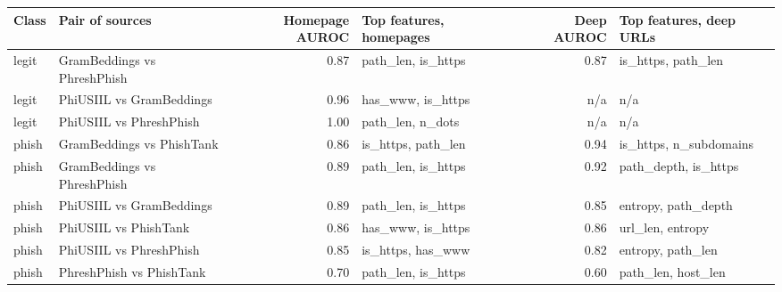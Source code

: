 {\footnotesize\setlength{\tabcolsep}{4pt}
\begin{tabular}{llrlrl}
\toprule
\textbf{Class} & \textbf{Pair of sources} & \textbf{Homepage AUROC} & \textbf{Top features, homepages} & \textbf{Deep AUROC} & \textbf{Top features, deep URLs} \\
\midrule
legit & GramBeddings vs PhreshPhish & 0.87 & path\_len, is\_https & 0.87 & is\_https, path\_len \\
legit & PhiUSIIL vs GramBeddings & 0.96 & has\_www, is\_https & n/a & n/a \\
legit & PhiUSIIL vs PhreshPhish & 1.00 & path\_len, n\_dots & n/a & n/a \\
phish & GramBeddings vs PhishTank & 0.86 & is\_https, path\_len & 0.94 & is\_https, n\_subdomains \\
phish & GramBeddings vs PhreshPhish & 0.89 & path\_len, is\_https & 0.92 & path\_depth, is\_https \\
phish & PhiUSIIL vs GramBeddings & 0.89 & path\_len, is\_https & 0.85 & entropy, path\_depth \\
phish & PhiUSIIL vs PhishTank & 0.86 & has\_www, is\_https & 0.86 & url\_len, entropy \\
phish & PhiUSIIL vs PhreshPhish & 0.85 & is\_https, has\_www & 0.82 & entropy, path\_len \\
phish & PhreshPhish vs PhishTank & 0.70 & path\_len, is\_https & 0.60 & path\_len, host\_len \\
\bottomrule
\end{tabular}
}
